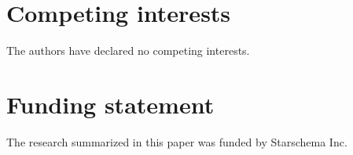 \documentclass[fleqn,10pt]{SelfArx} %
\begin{document}




\section*{Competing interests} %


The authors have declared no competing interests.

\section*{Funding statement} %


The research summarized in this paper was funded by Starschema Inc.






\end{document}
